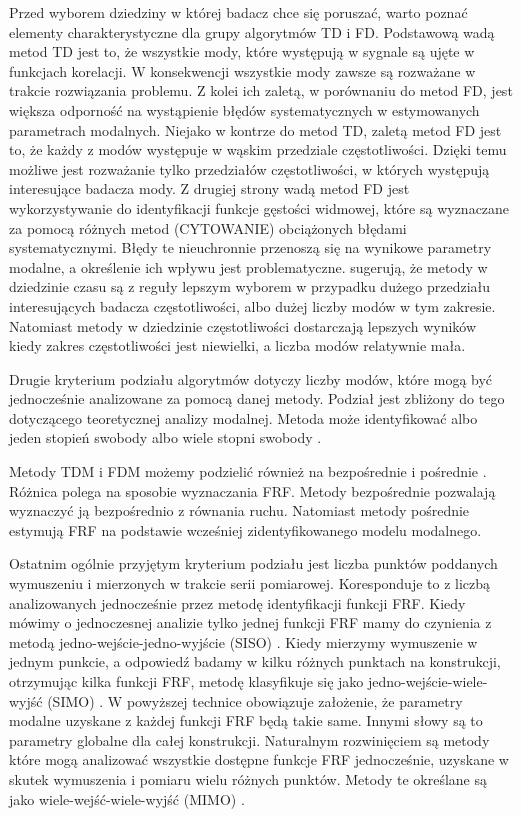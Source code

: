Przed wyborem dziedziny w której badacz chce się poruszać, warto poznać elementy charakterystyczne dla grupy algorytmów TD i FD. Podstawową wadą metod TD jest to, że wszystkie mody, które występują w sygnale są ujęte w funkcjach korelacji. W konsekwencji wszystkie mody zawsze są rozważane w trakcie rozwiązania problemu. Z kolei ich zaletą, w porównaniu do metod FD, jest większa odporność na wystąpienie błędów systematycznych w estymowanych parametrach modalnych. Niejako w kontrze do metod TD, zaletą metod FD jest to, że każdy z modów występuje w wąskim przedziale częstotliwości. Dzięki temu możliwe jest rozważanie tylko przedziałów częstotliwości, w których występują interesujące badacza mody. Z drugiej strony wadą metod FD jest wykorzystywanie do identyfikacji funkcje gęstości widmowej, które są wyznaczane za pomocą różnych metod (CYTOWANIE) obciążonych błędami systematycznymi. Błędy te nieuchronnie przenoszą się na wynikowe parametry modalne, a określenie ich wpływu jest problematyczne. \cite{Maia1997} sugerują, że metody w dziedzinie czasu są z reguły lepszym wyborem w przypadku dużego przedziału interesujących badacza częstotliwości, albo dużej liczby modów w tym zakresie. Natomiast metody w dziedzinie częstotliwości dostarczają lepszych wyników kiedy zakres częstotliwości jest niewielki, a liczba modów relatywnie mała. 

Drugie kryterium podziału algorytmów dotyczy liczby modów, które mogą być jednocześnie analizowane za pomocą danej metody. Podział jest zbliżony do tego dotyczącego teoretycznej analizy modalnej. Metoda może identyfikować albo jeden stopień swobody  albo wiele stopni swobody .

Metody TDM i FDM możemy podzielić również na bezpośrednie  i pośrednie . Różnica polega na sposobie wyznaczania FRF. Metody bezpośrednie pozwalają wyznaczyć ją bezpośrednio z równania ruchu. Natomiast metody pośrednie estymują FRF na podstawie wcześniej zidentyfikowanego modelu modalnego.

Ostatnim ogólnie przyjętym kryterium podziału jest liczba punktów poddanych wymuszeniu i mierzonych w trakcie serii pomiarowej. Koresponduje to z liczbą analizowanych jednocześnie przez metodę identyfikacji funkcji FRF. Kiedy mówimy o jednoczesnej analizie tylko jednej funkcji FRF mamy do czynienia z metodą jedno-wejście-jedno-wyjście (SISO) . Kiedy mierzymy wymuszenie w jednym punkcie, a odpowiedź badamy w kilku różnych punktach na konstrukcji, otrzymując kilka funkcji FRF, metodę klasyfikuje się jako jedno-wejście-wiele-wyjść (SIMO) . W powyższej technice obowiązuje założenie, że parametry modalne uzyskane z każdej funkcji FRF będą takie same. Innymi słowy są to parametry globalne dla całej konstrukcji. Naturalnym rozwinięciem są metody które mogą analizować wszystkie dostępne funkcje FRF jednocześnie, uzyskane w skutek wymuszenia i pomiaru wielu różnych punktów. Metody te określane są jako wiele-wejść-wiele-wyjść (MIMO) .

